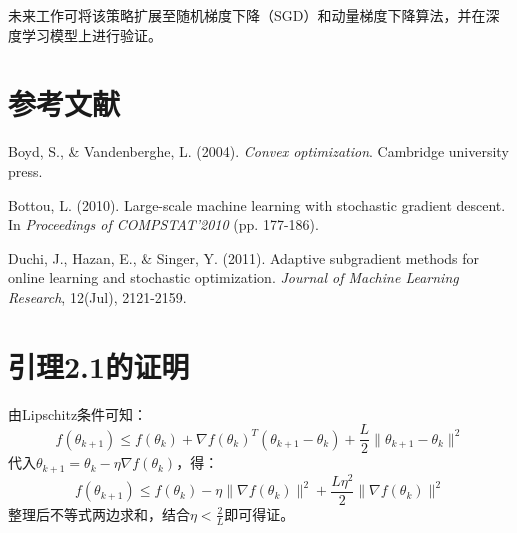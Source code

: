 \documentclass[12pt,a4paper,oneside]{article} %
\begin{document}
未来工作可将该策略扩展至随机梯度下降（SGD）和动量梯度下降算法，并在深度学习模型上进行验证。


\section{参考文献}

\begin{thebibliography}{9} %
    Boyd, S., \& Vandenberghe, L. (2004). 
    \textit{Convex optimization}. Cambridge university press.
    
    Bottou, L. (2010). 
    Large-scale machine learning with stochastic gradient descent. 
    In \textit{Proceedings of COMPSTAT'2010} (pp. 177-186).
    
    Duchi, J., Hazan, E., \& Singer, Y. (2011). 
    Adaptive subgradient methods for online learning and stochastic optimization. 
    \textit{Journal of Machine Learning Research}, 12(Jul), 2121-2159.
\end{thebibliography}


\appendix
\section{引理2.1的证明}
由Lipschitz条件可知：
\[
f(\theta_{k+1}) \leq f(\theta_k) + \nabla f(\theta_k)^T (\theta_{k+1} - \theta_k) + \frac{L}{2} \|\theta_{k+1} - \theta_k\|^2
\]
代入$\theta_{k+1} = \theta_k - \eta \nabla f(\theta_k)$，得：
\[
f(\theta_{k+1}) \leq f(\theta_k) - \eta \|\nabla f(\theta_k)\|^2 + \frac{L \eta^2}{2} \|\nabla f(\theta_k)\|^2
\]
整理后不等式两边求和，结合$\eta < \frac{2}{L}$即可得证。
\end{document}
